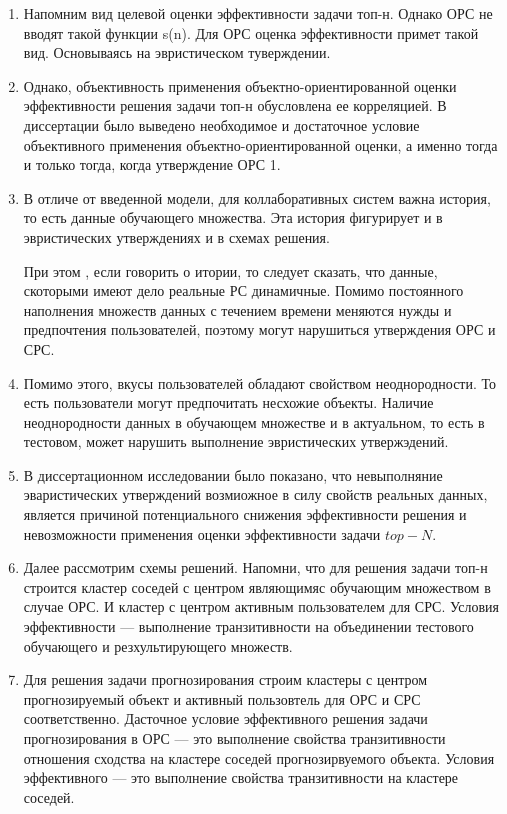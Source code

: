 \documentclass[a4paper,14pt]{proc}
\begin{document}
{\begin{enumerate}
Цель задачи $top-N$  --- предоставить такое множество, что его объекты схожи с активным
пользователем. Для определения примеров часто используемых оценок определим вспомогательную функцию с,
равную 1, если объект результирующего множества с порядковым номер н схож с активным пользователем. 0 --- иначе.
Результирующее множество упорядочено. 

\item Напомним вид целевой оценки эффективности задачи топ-н. Однако ОРС не вводят такой функции s(n).
Для ОРС оценка эффективности примет такой вид. Основываясь на эвристическом туверждении.

\item Однако, объективность применения объектно-ориентированной оценки эффективности решения задачи топ-н обусловлена ее корреляцией. В диссертации было
выведено необходимое и достаточное условие объективного применения объектно-ориентированной оценки, а именно тогда и только тогда, когда
утверждение ОРС 1. 

\item В отличе от введенной модели, для коллаборативных систем важна история, то есть данные обучающего множества.
Эта история фигурирует и в эвристических утверждениях и в схемах решения.

При этом , если говорить о итории, то следует сказать, что данные, скоторыми имеют дело реальные 
РС динамичные. Помимо постоянного наполнения множеств данных с течением времени меняются нужды и предпочтения пользователей,
поэтому  могут нарушиться утверждения ОРС и СРС.

\item Помимо этого, вкусы пользователей обладают свойством неоднородности. То есть пользователи могут предпочитать несхожие объекты.
Наличие неоднородности данных в обучающем множестве и в актуальном, то есть в тестовом, может нарушить выполнение 
эвристических утвержэдений.

\item В диссертационном исследовании было показано, что невыполняние эваристических утверждений возмиожное 
в силу свойств реальных данных, является причиной потенциального снижения эффективности решения и невозможности 
применения оценки эффективности задачи $top-N$.


\item Далее рассмотрим схемы решений. Напомни, что для решения задачи топ-н строится кластер соседей
с центром являющимяс обучающим множеством в случае ОРС. И кластер с центром активным пользователем для СРС.
Условия эффективности --- выполнение транзитивности на объединении тестового обучающего и резхультирующего множеств.
\item Для решения задачи прогнозирования строим кластеры с центром прогнозируемый объект и активный пользовтель для ОРС и СРС соответственно.
Дасточное условие эффективного решения задачи прогнозирования в ОРС --- это выполнение свойства транзитивности отношения сходства на кластере
соседей прогнозирвуемого объекта. Условия эффективного  --- это выполнение свойства транзитивности на кластере соседей. 


\end{enumerate}}
\end{document}
